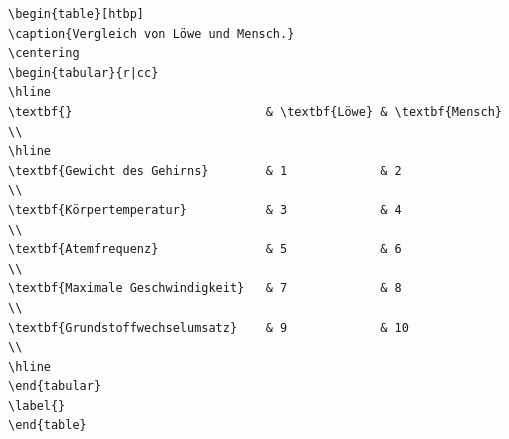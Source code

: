 \documentclass["WS\space 16-17\space -\space LaTeX-Kurs\space -\space Praesentation\space -\space 2.tex"]{subfiles}
\begin{document}
\begin{frame}[fragile]
	\Code
	\begin{lstlisting}
\begin{table}[htbp]
\caption{Vergleich von Löwe und Mensch.}
\centering
\begin{tabular}{r|cc}
\hline 
\textbf{}							& \textbf{Löwe} & \textbf{Mensch} 	\\  
\hline 
\textbf{Gewicht des Gehirns}		& 1 			& 2 				\\  
\textbf{Körpertemperatur}			& 3				& 4 				\\  
\textbf{Atemfrequenz}				& 5				& 6 				\\ 
\textbf{Maximale Geschwindigkeit}	& 7 			& 8 				\\  
\textbf{Grundstoffwechselumsatz}	& 9 			& 10 				\\ 
\hline
\end{tabular} 
\label{}
\end{table}
	\end{lstlisting}
\end{frame}
\end{document}
